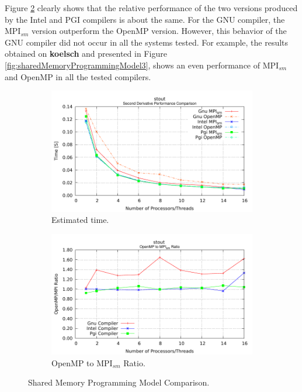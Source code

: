 \medskip

Figure \ref{fig:sharedMemoryRatioComparison2} clearly shows that the relative performance of the two versions produced by the Intel and PGI compilers is about the same. For the GNU compiler, the MPI$_{sm}$ version outperform the OpenMP version. However, this behavior of the GNU compiler did not occur in all the systems tested. For example, the results obtained on \textbf{koelsch} and presented in Figure \ref{fig:sharedMemoryProgrammingModel3}, 
shows an even performance of MPI$_{sm}$ and OpenMP in all the tested compilers.


\begin{figure} [t!]
    \centering
    \captionsetup{justification=centering, singlelinecheck=false}
    \begin{subfigure}{.6\textwidth}
      \centering
      \hspace*{-1.5cm} 
      \includegraphics[width=0.95\linewidth]{Plots/FirstTouch/stout.pdf}
      \caption[]{Estimated time.}
      \label{fig:sharedMemoryComparison2}
    \end{subfigure}%
    \begin{subfigure}{.6\textwidth}
      \centering
      \hspace*{-1.5cm} 
      \includegraphics[width=0.95\linewidth]{Plots/FirstTouch/stoutRatio.pdf}
      \caption{OpenMP to MPI$_{sm}$ Ratio.}
      \label{fig:sharedMemoryRatioComparison2}
    \end{subfigure}%
\caption{Shared Memory Programming Model Comparison.}
\label{fig:sharedMemoryProgrammingModel2}
\end{figure}



